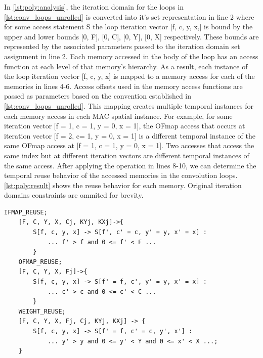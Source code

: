 In \autoref{lst:poly:analysis}, the iteration domain for the loops in
\autoref{lst:conv_loops_unrolled} is converted into it's set representation in
line 2 where for some access statement S the loop iteration vector [f, c, y, x,]
is bound by the upper and lower bounds [0, F], [0, C], [0, Y], [0, X]
respectively. These bounds are represented by the associated parameters passed
to the iteration domain set assignment in line 2. Each memory accessed in the
body of the loop has an access function at each level of that memory's
hierarchy. As a result, each instance of the loop iteration vector [f, c, y, x]
is mapped to a memory access for each of the memories in lines 4-6. Access
offsets used in the memory access functions are passed as parameters based on
the convention established in \autoref{lst:conv_loops_unrolled}. This mapping
creates multiple temporal instances for each memory access in each \ac{MAC}
spatial instance.  For
example, for some iteration vector [f = 1, c = 1, y = 0, x = 1],
 the OFmap access that occurs at iteration vector [f = 2, c= 1, y = 0,
x = 1] is a different temporal instance of the same OFmap access at [f = 1, c = 1,
y = 0, x = 1]. 
Two accesses that access the same index but at different
iteration vectors are different temporal instances of the same access.
After applying the operation in lines 8-10, we can determine the
temporal reuse behavior of the accessed memories in the convolution loops.  
\autoref{lst:poly:result} shows the reuse behavior for each memory. Original
iteration domains constraints are ommited for brevity. 

\clearpage
\begin{lstlisting}[caption=Polyhedral analysis results w.r.t data elements in convolution loops, label={lst:poly:result}]
    IFMAP_REUSE;
    [F, C, Y, X, Cj, KYj, KXj]->{
        S[f, c, y, x] -> S[f', c' = c, y' = y, x' = x] :
            ... f' > f and 0 <= f' < F ... 
        }
    OFMAP_REUSE;
    [F, C, Y, X, Fj]->{ 
        S[f, c, y, x] -> S[f' = f, c', y' = y, x' = x] : 
            ... c' > c and 0 <= c' < C ... 
        }
    WEIGHT_REUSE;
    [F, C, Y, X, Fj, Cj, KYj, KXj] -> { 
        S[f, c, y, x] -> S[f' = f, c' = c, y', x'] : 
            ... y' > y and 0 <= y' < Y and 0 <= x' < X ...; 
    }
\end{lstlisting}

